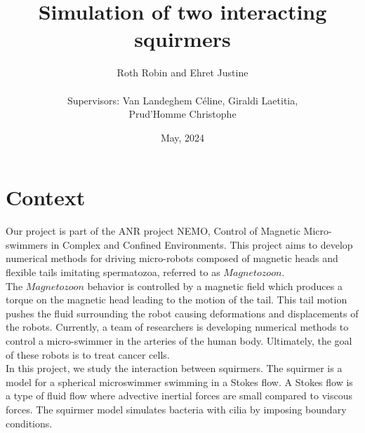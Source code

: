 \documentclass{article}
\begin{document}
\title{Simulation of two interacting squirmers}
\author{Roth Robin and Ehret Justine\\
\\
Supervisors: Van Landeghem Céline, Giraldi Laetitia,\\ Prud'Homme Christophe}
\date{May, 2024}
\maketitle

\tableofcontents

\section{Context}
Our project is part of the ANR project NEMO, Control of Magnetic Micro-swimmers in Complex and Confined Environments.
This project aims to develop numerical methods for driving micro-robots composed of magnetic heads and flexible tails imitating spermatozoa, referred to as $Magnetozoon$.\cite{Nemov10}\\
The $Magnetozoon$ behavior is controlled by a magnetic field which produces a torque on the magnetic head leading to the motion of the tail.
This tail motion pushes the fluid surrounding the robot causing deformations and displacements of the robots.
Currently, a team of researchers is developing numerical methods to control a micro-swimmer in the arteries
of the human body. Ultimately, the goal of these robots is to treat cancer cells. \\
In this project, we study the interaction between squirmers. The squirmer is a model for a spherical microswimmer swimming in a Stokes flow. \cite{Wikipedia}
A Stokes flow is a type of fluid flow where advective inertial forces are small compared to viscous forces.
The squirmer model simulates bacteria with cilia by imposing boundary conditions.


\vspace{0.5cm}
\end{document}
